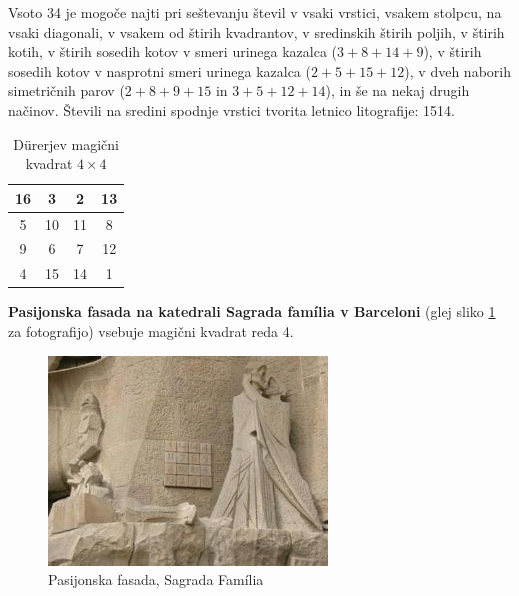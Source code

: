 \documentclass[a4paper,12pt]{article}
\theoremstyle{definition}
\theoremstyle{plain}
\begin{document}
Vsoto 34 je mogoče najti pri seštevanju števil v vsaki vrstici, vsakem stolpcu,
na vsaki diagonali, v vsakem od štirih kvadrantov, v sredinskih štirih poljih,
v štirih kotih, v štirih sosedih kotov v smeri urinega kazalca ($3+8+14+9$), v
štirih sosedih kotov v nasprotni smeri urinega kazalca ($2+5+15+12$), v dveh naborih
simetričnih parov ($2+8+9+15$ in $3+5+12+14$), in še na nekaj drugih načinov.
Števili na sredini spodnje vrstici tvorita letnico litografije: 1514.
%
\begin{table}[!ht]
   \caption{Dürerjev magični kvadrat $4\times 4$}
   \label{table:durer}
   \centering
   \large
   \begin{tabular}{|c|c|c|c|}
      \hline
      16 & 3 & 2 & 13 \\\hline
      5 & 10 & 11 & 8 \\\hline
      9 & 6 & 7 & 12 \\\hline
      4 & 15 & 14 & 1 \\\hline
   \end{tabular}
\end{table}

\textbf{Pasijonska fasada na katedrali Sagrada família v Barceloni}
(glej sliko \ref{fig:sagrada} za fotografijo) vsebuje magični kvadrat reda 4.

\begin{figure}[!ht]
   \centering
   \caption{Pasijonska fasada, Sagrada Família}
   \label{fig:sagrada}
   \includegraphics[scale=0.45]{sagrada.png}
\end{figure}
\end{document}
